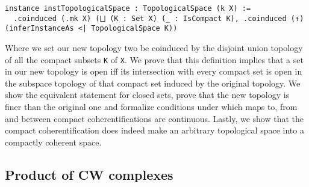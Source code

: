 \begin{lstlisting}[frame=single]
instance instTopologicalSpace : TopologicalSpace (k X) :=
  .coinduced (.mk X) (⨆ (K : Set X) (_ : IsCompact K), .coinduced (↑) (inferInstanceAs <| TopologicalSpace K))
\end{lstlisting}

Where we set our new topology two be coinduced by the disjoint union topology of all the compact subsets \lstinline|K| of \lstinline|X|. 
We prove that this definition implies that a set in our new topology is open iff its intersection with every compact set is open in the subspace topology of that compact set induced by the original topology. 
We show the equivalent statement for closed sets, prove that the new topology is finer than the original one and formalize conditions under which maps to, from and between compact coherentifications are continuous. 
Lastly, we show that the compact coherentification does indeed make an arbitrary topological space into a compactly coherent space. 

\subsection{Product of CW complexes}

